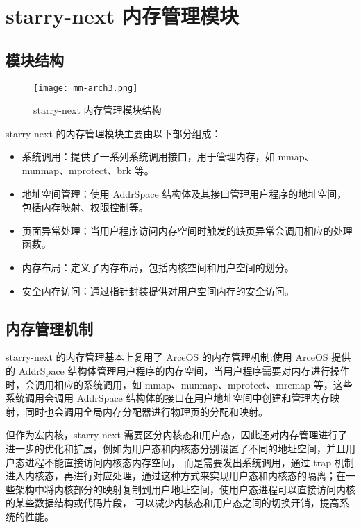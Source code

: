 \section{starry-next 内存管理模块}

\subsection{模块结构}

\begin{figure}[H]
    \centering
    \texttt{[image: mm-arch3.png]}
    \caption{starry-next 内存管理模块结构}
    \label{fig:mm-arch}
\end{figure}

starry-next 的内存管理模块主要由以下部分组成：

\begin{itemize}
    \item 系统调用：提供了一系列系统调用接口，用于管理内存，如 mmap、munmap、mprotect、brk 等。
    \item 地址空间管理：使用 AddrSpace 结构体及其接口管理用户程序的地址空间，包括内存映射、权限控制等。
    \item 页面异常处理：当用户程序访问内存空间时触发的缺页异常会调用相应的处理函数。
    \item 内存布局：定义了内存布局，包括内核空间和用户空间的划分。
    \item 安全内存访问：通过指针封装提供对用户空间内存的安全访问。
\end{itemize}

\subsection{内存管理机制}

starry-next 的内存管理基本上复用了 ArceOS 的内存管理机制:使用 ArceOS 提供的 AddrSpace 结构体管理用户程序的内存空间，当用户程序需要对内存进行操作时，会调用相应的系统调用，如 mmap、munmap、mprotect、mremap 等，这些系统调用会调用 AddrSpace 结构体的接口在用户地址空间中创建和管理内存映射，同时也会调用全局内存分配器进行物理页的分配和映射。

但作为宏内核，starry-next 需要区分内核态和用户态，因此还对内存管理进行了进一步的优化和扩展，例如为用户态和内核态分别设置了不同的地址空间，并且用户态进程不能直接访问内核态内存空间，
而是需要发出系统调用，通过 trap 机制进入内核态，再进行对应处理，通过这种方式来实现用户态和内核态的隔离；在一些架构中将内核部分的映射复制到用户地址空间，使用户态进程可以直接访问内核的某些数据结构或代码片段，
可以减少内核态和用户态之间的切换开销，提高系统的性能。


